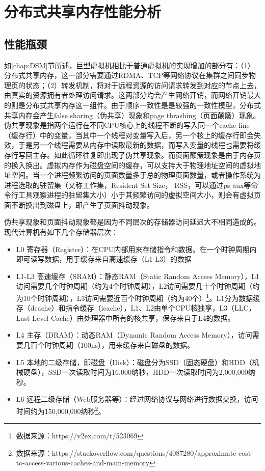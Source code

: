 \section{分布式共享内存性能分析}
\subsection{性能瓶颈}
\label{chap:bottle}
如\ref{chap:DSM}节所述，巨型虚拟机相比于普通虚拟机的实现增加的部分有：（1）分布式共享内存，这一部分需要通过RDMA、TCP等网络协议在集群之间同步物理页的状态；（2）转发机制，将对于远程资源的访问请求转发到对应的节点上去，由真实的资源拥有者处理访问请求。这两部分均会产生网络开销，而网络开销最大的则是分布式共享内存这一组件。由于顺序一致性是是较强的一致性模型，分布式共享内存会产生false sharing（伪共享）现象和page thrashing（页面颠簸）现象\cite{sharing}。伪共享现象是指两个运行在不同CPU核心上的线程不断的写入同一个cache line（缓存行）中的变量，当其中一个线程对变量写入后，另一个核上的缓存行即会失效，于是另一个线程需要从内存中读取最新的数据，而写入变量的线程也需要将缓存行写回主存。如此循环往复即出现了伪共享现象。而页面颠簸现象是由于内存页的换入换出。虚拟内存作为磁盘空间的缓存，可以支持大于物理地址空间的虚拟地址空间。当一个进程频繁访问的页面数量多于总的物理页面数量，或者操作系统为进程选取的驻留集（又称工作集，Resident Set Size， RSS，可以通过ps aux等命令行工具观察进程的驻留集大小）小于其频繁访问的虚拟空间大小，则会有虚拟页面不断换出到磁盘上，即产生了页面抖动现象。

\label{chap:STOR}
伪共享现象和页面抖动现象都是因为不同层次的存储器访问延迟大不相同造成的。现代计算机有如下几个存储器层次\cite{csapp}：
\begin{itemize}
  \item L0 寄存器（Register）：在CPU内部用来存储指令和数据。在一个时钟周期内即可读写数据，用于缓存来自高速缓存（L1-L3）的数据
  \item L1-L3 高速缓存（SRAM）：静态RAM（Static Random Access Memory），L1访问需要几个时钟周期（约为4个时钟周期），L2访问需要几十个时钟周期（约为10个时钟周期），L3访问需要近百个时钟周期（约为40个）\footnote{数据来源：https://v2ex.com/t/523069}。L1分为数据缓存（dcache）和指令缓存（icache），L1、L2由单个CPU核独享，L3（LLC， Last Level Cache）由处理器中所有的核共享，保存来自于L4的数据。
  \item L4 主存（DRAM）：动态RAM（Dynamic Random Access Memory），访问需要几百个时钟周期（100ns），用来缓存来自磁盘的数据。
  \item L5 本地的二级存储，即磁盘（Disk）：磁盘分为SSD（固态硬盘）和HDD（机械硬盘），SSD一次读取时间为16,000纳秒，HDD一次读取时间为2,000,000纳秒。
  \item L6 远程二级存储（Web服务器等）：经过网络协议与网络进行数据交换，访问时间约为150,000,000纳秒\footnote{数据来源：https://stackoverflow.com/questions/4087280/approximate-cost-to-access-various-caches-and-main-memory}。
\end{itemize}

